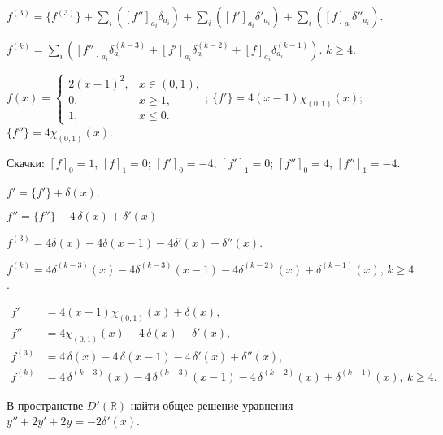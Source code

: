 \begin{sol}
	$f^{(3)}=\{f^{(3)}\}+\sum_i([f'']_{a_i}\delta_{a_i})+\sum_i([f']_{a_i}\delta'_{a_i})+\sum_i([f]_{a_i}\delta''_{a_i})$.

	$f^{(k)}=\sum_i([f'']_{a_i}\delta^{(k-3)}_{a_i}+[f']_{a_i}\delta^{(k-2)}_{a_i}+[f]_{a_i}\delta^{(k-1)}_{a_i})$.
	$k\geq4$.

	$
		f(x) =
		\begin{cases}
			2(x-1)^2, & x \in (0,1), \\
			0,        & x \ge 1,     \\
			1,        & x \le 0.
		\end{cases}
	$;
	$
		\{f'\}=4(x-1){\chi_{(0,1)}(x)}
	$;
	$
		\{f''\}=4{\chi_{(0,1)}(x)}
	$.

	Скачки:
	$[f]_0=1$, $[f]_1=0$; $[f']_0=-4$, $[f']_1=0$; $[f'']_0=4$, $[f'']_1=-4$.

	$f'=\{f'\}+\delta(x)$.

	$f''=\{f''\}-4\,\delta(x)+\delta'(x)$

	$f^{(3)}=4\delta(x)-4\delta(x-1)-4\delta'(x)+\delta''(x).$

	$f^{(k)}=4\delta^{(k-3)}(x)-4\delta^{(k-3)}(x-1)-4\delta^{(k-2)}(x)+\delta^{(k-1)}(x)$,
	$k\ge4$.


\end{sol}

\begin{out}
	\[
		\boxed{
			\begin{aligned}
				f'      & =4(x-1){\chi_{(0,1)}(x)}+\delta(x),                                                           \\
				f''     & =4{\chi_{(0,1)}(x)}-4\,\delta(x)+\delta'(x),                                                  \\
				f^{(3)} & =4\,\delta(x)-4\,\delta(x-1)-4\,\delta'(x)+\delta''(x),                                       \\
				f^{(k)} & =4\,\delta^{(k-3)}(x)-4\,\delta^{(k-3)}(x-1)-4\,\delta^{(k-2)}(x)+\delta^{(k-1)}(x),\ k\ge 4.
			\end{aligned}}
	\]
\end{out}

\newpage
{}
\begin{cond}
	В пространстве \(D'(\mathbb{R})\) найти общее решение уравнения
	$y'' + 2y' + 2y = -2\delta'(x)$.
\end{cond}
